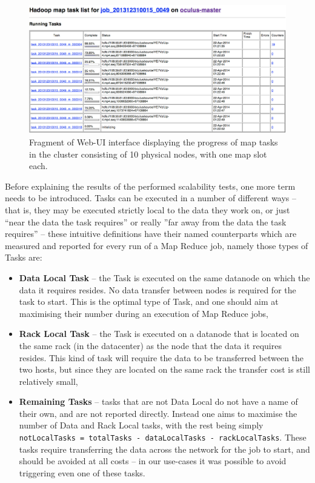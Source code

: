 \begin{figure}[ch!]
  \centering
  \includegraphics[width=\textwidth]{img/hadoop/10tasks-parallel}
  \caption{Fragment of Web-UI interface displaying the progress of map tasks in the cluster consisting of 10 physical nodes, with one map slot each.}
  \label{fig:ten-mappers-executing-map}
\end{figure}

Before explaining the results of the performed scalability tests, one more term needs to be introduced. Tasks can be executed in a number of different ways -- that is, they may be executed strictly local to the data they work on, or just ``near the data the task requires'' or really ''far away from the data the task requires'' -- these intuitive definitions have their named counterparts which are measured and reported for every run of a Map Reduce job, namely those types of Tasks are:

\newpage
\begin{itemize}
  \item \textbf{Data Local Task} -- the Task is executed on the same datanode on which the data it requires resides. No data transfer between nodes is required for the task to start. This is the optimal type of Task, and one should aim at maximising their number during an execution of Map Reduce jobs,
  \item \textbf{Rack Local Task} -- the Task is executed on a datanode that is located on the same rack (in the datacenter) as the node that the data it requires resides. This kind of task will require the data to be transferred between the two hosts, but since they are located on the same rack the transfer cost is still relatively small,
  \item \textbf{Remaining Tasks} -- tasks that are not Data Local do not have a name of their own, and are not reported directly. Instead one aims to maximise the number of Data and Rack Local tasks, with the rest being simply \verb|notLocalTasks = totalTasks - dataLocalTasks - rackLocalTasks|. These tasks require transferring the data across the network for the job to start, and should be avoided at all costs -- in our use-cases it was possible to avoid triggering even one of these tasks.
\end{itemize}

